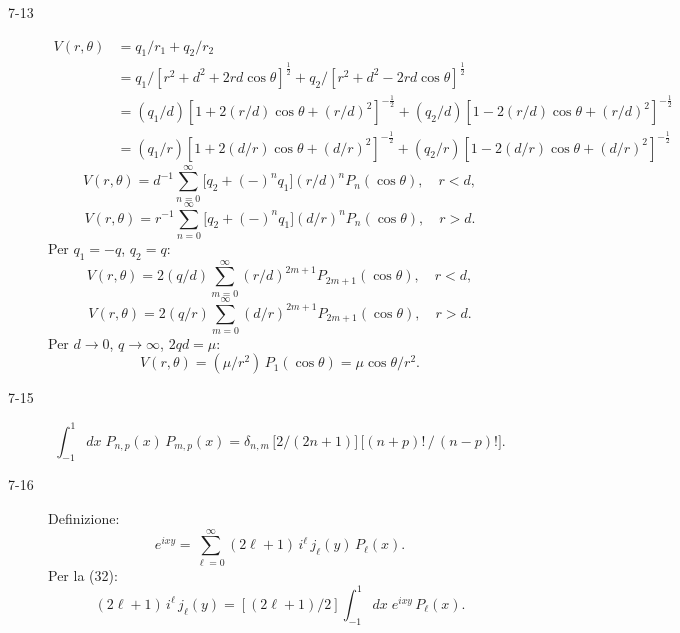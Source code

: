 \documentclass[11pt, a4paper]{book}
\numberwithin{equation}{section}
\begin{document}
\begin{description}
\item[7-13]
\begin{align*}
  V(r,\theta) &= q_1/r_1 + q_2/r_2\\
  &= q_1/\!\left[r^2+d^2+2rd\cos\theta\right]^{\frac{1}{2}}
   + q_2/\!\left[r^2+d^2-2rd\cos\theta\right]^{\frac{1}{2}}\\
  &= (q_1/d)\left[1+2(r/d)\cos\theta+(r/d)^2\right]^{-\frac{1}{2}}
   +(q_2/d)\left[1-2(r/d)\cos\theta+(r/d)^2\right]^{-\frac{1}{2}}\\
  &= (q_1/r)\left[1+2(d/r)\cos\theta+(d/r)^2\right]^{-\frac{1}{2}}
   +(q_2/r)\left[1-2(d/r)\cos\theta+(d/r)^2\right]^{-\frac{1}{2}}
\end{align*}
\[
  V(r,\theta) = d^{-1}\sum_{n=0}^{\infty}\bigl[q_2+(-)^n q_1\bigr](r/d)^n P_n(\cos\theta),\quad r<d,
\]
\[
  V(r,\theta) = r^{-1}\sum_{n=0}^{\infty}\bigl[q_2+(-)^n q_1\bigr](d/r)^n P_n(\cos\theta),\quad r>d.
\]
Per $q_1=-q$, $q_2=q$:
\[
  V(r,\theta) = 2(q/d)\sum_{m=0}^{\infty}(r/d)^{2m+1} P_{2m+1}(\cos\theta),\quad r<d,
\]
\[
  V(r,\theta) = 2(q/r)\sum_{m=0}^{\infty}(d/r)^{2m+1} P_{2m+1}(\cos\theta),\quad r>d.
\]
Per $d\to0$, $q\to\infty$, $2qd=\mu$:
\[
  V(r,\theta) = (\mu/r^2)\,P_1(\cos\theta) = \mu\cos\theta/r^2.
\]

\item[7-15]
\[
  \int_{-1}^{1} dx\; P_{n,p}(x)\,P_{m,p}(x)
  = \delta_{n,m}\,\bigl[2/(2n+1)\bigr]\,\bigl[(n+p)!\,/\,(n-p)!\bigr].
\]

\item[7-16] Definizione:
\[
  e^{ixy} = \sum_{\ell=0}^{\infty}(2\ell+1)\,i^\ell\,j_\ell(y)\,P_\ell(x).
\]
Per la (32):
\[
  (2\ell+1)\,i^\ell\,j_\ell(y)
  = \left[(2\ell+1)/2\right]\int_{-1}^{1} dx\; e^{ixy}\,P_\ell(x).
\]


\end{description}
\end{document}
